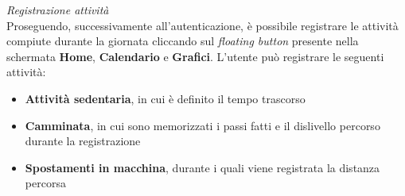 \documentclass{article}
\begin{document}
\begin{center}
    \begin{figure}[h]
        \centering
    \end{figure}
\end{center}
\textit{Registrazione attività} \vspace*{7pt}\\
Proseguendo, successivamente all'autenticazione, è possibile registrare le attività compiute durante la giornata cliccando sul \textit{floating button} presente nella schermata \textbf{Home}, \textbf{Calendario} e \textbf{Grafici}. L'utente può registrare le seguenti attività:
\begin{itemize}
    \renewcommand{\labelitemi}{-}
    \item \textbf{Attività sedentaria}, in cui è definito il tempo trascorso
    \item \textbf{Camminata}, in cui sono memorizzati i passi fatti e il dislivello percorso durante la registrazione
    \item \textbf{Spostamenti in macchina}, durante i quali viene registrata la distanza percorsa
\end{itemize}
\end{document}
